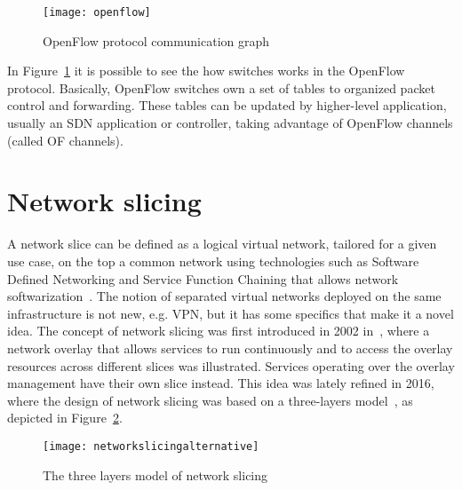 \begin{figure}[t]
 \centering
 \texttt{[image: openflow]}
 \caption{OpenFlow protocol communication graph}
 \label{chap:background:img:openflow_protocol}
\end{figure}

In Figure~\ref{chap:background:img:openflow_protocol} it is possible to see the
how switches works in the OpenFlow protocol. Basically, OpenFlow switches own a
set of tables to organized packet control and forwarding. These tables can be
updated by higher-level application, usually an SDN application or controller,
taking advantage of OpenFlow channels (called OF channels). 

\section{Network slicing}
A network slice can be defined as a logical virtual network, tailored for a
given use case, on the top a common network using technologies such as
Software Defined Networking and Service Function Chaining that allows network
softwarization~\cite{ordonez2017network}. The notion of separated virtual
networks deployed on the same infrastructure is not new, e.g. VPN, but it has
some specifics that make it a novel idea. The concept of network slicing was
first introduced in 2002 in~\cite{peterson2003blueprint}, where a network 
overlay that allows services to run continuously and to access the overlay
resources across different slices was illustrated.
Services operating over the overlay management have their own slice instead.
This idea was lately refined in 2016, where the design of network slicing was
based on a three-layers model~\cite{alliance2016description}, as depicted in 
Figure~\ref{chap:background:img:network_slicing}.

\begin{figure}[t]
  \centering
  \texttt{[image: networkslicingalternative]}
  \caption[The three layers model of network slicing]{The three layers model of
    network slicing~\cite{kim20173gpp}}
  \label{chap:background:img:network_slicing}
\end{figure}


